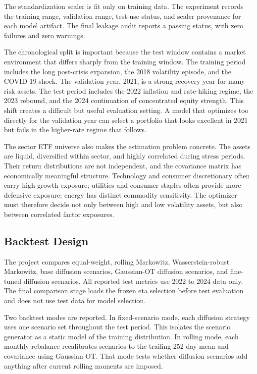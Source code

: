 \documentclass{article}
\begin{document}
The standardization scaler is fit only on training data. The experiment records
the training range, validation range, test-use status, and scaler provenance for
each model artifact. The final leakage audit reports a passing status, with zero
failures and zero warnings.

The chronological split is important because the test window contains a market
environment that differs sharply from the training window. The training period
includes the long post-crisis expansion, the 2018 volatility episode, and the
COVID-19 shock. The validation year, 2021, is a strong recovery year for many
risk assets. The test period includes the 2022 inflation and rate-hiking regime,
the 2023 rebound, and the 2024 continuation of concentrated equity strength.
This shift creates a difficult but useful evaluation setting. A model that
optimizes too directly for the validation year can select a portfolio that looks
excellent in 2021 but fails in the higher-rate regime that follows.

The sector ETF universe also makes the estimation problem concrete. The assets
are liquid, diversified within sector, and highly correlated during stress
periods. Their return distributions are not independent, and the covariance
matrix has economically meaningful structure. Technology and consumer
discretionary often carry high growth exposure; utilities and consumer staples
often provide more defensive exposure; energy has distinct commodity sensitivity.
The optimizer must therefore decide not only between high and low volatility
assets, but also between correlated factor exposures.

\subsection{Backtest Design}

The project compares equal-weight, rolling Markowitz, Wasserstein-robust
Markowitz, base diffusion scenarios, Gaussian-OT diffusion scenarios, and
fine-tuned diffusion scenarios. All reported test metrics use 2022 to 2024 data
only. The final comparison stage loads the frozen eta selection before test
evaluation and does not use test data for model selection.

Two backtest modes are reported. In fixed-scenario mode, each diffusion strategy
uses one scenario set throughout the test period. This isolates the scenario
generator as a static model of the training distribution. In rolling mode, each
monthly rebalance recalibrates scenarios to the trailing 252-day mean and
covariance using Gaussian OT. That mode tests whether diffusion scenarios add
anything after current rolling moments are imposed.
\end{document}
